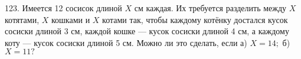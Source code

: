 123. Имеется 12 сосисок длиной $X$ см каждая. Их требуется разделить между $X$ котятами, $X$ кошками и $X$ котами так, чтобы каждому котёнку достался кусок сосиски длиной 3 см, каждой кошке ---
кусок сосиски длиной 4 см, а каждому коту --- кусок сосиски длиной 5 см. Можно ли это сделать, если а) $X = 14;$ б) $X = 11?$\\
